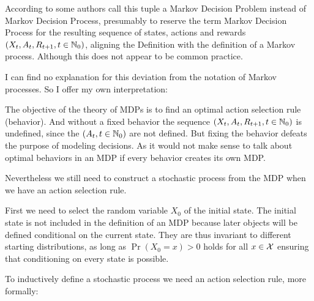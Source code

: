 According to \textcite{putermanMarkovDecisionProcesses2014} some authors call this tuple a Markov Decision Problem instead of Markov Decision Process, presumably to reserve the term Markov Decision Process for the resulting sequence of states, actions and rewards \((X_t,A_t,R_{t+1},t\in\mathbb{N}_0)\), aligning the Definition with the definition of a Markov process. Although this does not appear to be common practice.

I can find no explanation for this deviation from the notation of Markov processes. So I offer my own interpretation:

The objective of the theory of MDPs is to find an optimal action selection rule (behavior). And without a fixed behavior the sequence \((X_t, A_t, R_{t+1}, t\in\mathbb{N}_0 )\) is undefined, since the \((A_t,t\in\mathbb{N}_0)\) are not defined. But fixing the behavior defeats the purpose of modeling decisions. As it would not make sense to talk about optimal behaviors in an MDP if every behavior creates its own MDP.\vspace{1\baselineskip} 

Nevertheless we still need to construct a stochastic process from the MDP when we have an action selection rule. 

First we need to select the random variable \(X_0\) of the initial state. The initial state is not included in the definition of an MDP because later objects will be defined conditional on the current state. They are thus invariant to different starting distributions, as long as \(\Pr(X_0=x)>0\) holds for all \(x\in\mathcal{X}\) ensuring that conditioning on every state is possible.

To inductively define a stochastic process we need an action selection rule, more formally:

